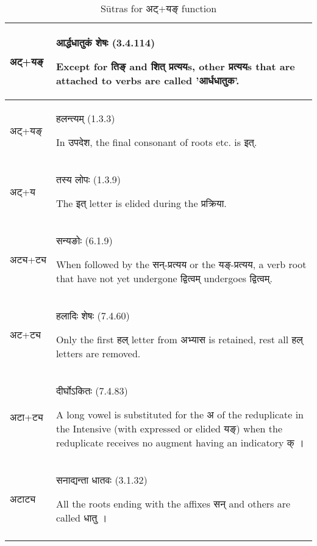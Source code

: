 		\begin{longtable}{ |p{1.4cm}|p{14.6cm}| } 
			\hline
			\rowcolor{red!10}
			\texthindi{अट्}+\texthindi{यङ्}
			&\texthindi{आर्द्धधातुकं शेषः}  (3.4.114)
			
			Except for \texthindi{तिङ्} and \texthindi{शित् प्रत्यय}s, other \texthindi{प्रत्यय}s that are attached to verbs are called '\texthindi{आर्धधातुक}'. 
			\\\hline
			\rowcolor{blue!10}
			\texthindi{अट्}+\texthindi{यङ्}
			&\texthindi{हलन्त्यम्} (1.3.3)
			
			In \texthindi{उपदेश}, the final consonant of roots etc. is \texthindi{इत्}.
			\\\hline
			\rowcolor{blue!10}
			\texthindi{अट्}+\texthindi{य}
			&\texthindi{तस्य लोपः} (1.3.9)
			
			The \texthindi{इत्} letter is elided during the \texthindi{प्रक्रिया}.
			\\\hline
			\rowcolor{green!10}
			\texthindi{अट्य}+\texthindi{ट्य}
			&\texthindi{सन्यङोः} (6.1.9)
			
			When followed by the \texthindi{सन्-प्रत्यय} or the \texthindi{यङ्-प्रत्यय}, a verb root that have not yet undergone \texthindi{द्वित्वम्} undergoes \texthindi{द्वित्वम्}.
			\\\hline
			\rowcolor{green!10}
			\texthindi{अट}+\texthindi{ट्य}
			&\texthindi{हलादिः शेषः} (7.4.60)
			
			Only the first \texthindi{हल्} letter from \texthindi{अभ्यास} is retained, rest all \texthindi{हल्} letters are removed. 
			\\\hline
			\rowcolor{green!10}
			\texthindi{अटा}+\texthindi{ट्य}
			&\texthindi{दीर्घोऽकितः} (7.4.83)
			
			A long vowel is substituted for the \texthindi{अ} of the reduplicate in the Intensive (with expressed or elided \texthindi{यङ्}) when the reduplicate receives no augment having an indicatory \texthindi{क्} ।
			\\\hline
			\rowcolor{yellow!10}
			\texthindi{अटाट्य}
			&\texthindi{सनाद्यन्ता धातवः} (3.1.32)
			
			All the roots ending with the affixes \texthindi{सन्} and others are called \texthindi{धातु} ।
			\\\hline
		
		\caption{Sūtras for \texthindi{अट्$+$यङ्} function}
		\label{table:a14}
		\end{longtable}

